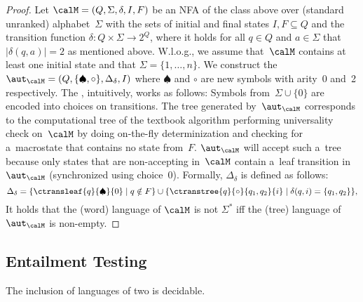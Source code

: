 \begin{proof}
Let $\calM = (Q, \Sigma, \delta, I, F)$ be an NFA of the class above over
(standard unranked) alphabet~$\Sigma$ with
the sets of initial and final states $I,F \subseteq Q$ and the transition
function $\delta\colon Q \times \Sigma \to 2^Q$, where it holds for all $q
\in Q$ and $a\in \Sigma$ that $|\delta(q,a)| = 2$ as mentioned above.
W.l.o.g., we assume that~$\calM$ contains at least one
initial state
and that $\Sigma = \{1, \ldots, n\}$.
We construct the \lsta $\aut_\calM = (Q, \{\spadesuit, \circ\}, \Delta_\delta, I)$
where $\spadesuit$ and $\circ$ are new symbols with arity~0 and~2 respectively.
The \lsta, intuitively, works as follows: Symbols from~$\Sigma\cup \{0\}$ are encoded into choices on transitions.
The tree generated by~$\aut_\calM$ corresponds to the computational tree of the
textbook algorithm performing universality check on~$\calM$ by doing on-the-fly
determinization and checking for a~macrostate that contains no state
from~$F$.
$\aut_\calM$ will accept such a~tree because only states that are non-accepting
in~$\calM$ contain a~leaf transition in~$\aut_\calM$ (synchronized using choice~$0$).
Formally, $\Delta_\delta$ is defined as follows:
\begin{equation}
  \Delta_\delta =  \{\ctransleaf{q}{\spadesuit}{0} \mid q \notin F\} \cup
                      \{\ctranstree{q}{\circ}{q_1,q_2}{i} \mid \delta(q, i) = \{q_1, q_2\}\},
\end{equation}
%
It holds that the (word) language of $\calM$ is not $\Sigma^*$ iff the (tree)
language of $\aut_\calM$ is non-empty.
\end{proof}

\vspace{-0.0mm}
\subsection{Entailment Testing}
\vspace{-0.0mm}

\begin{theorem}\label{thm:inclusion}
    The inclusion of languages of two \lstas is decidable.
\end{theorem}

